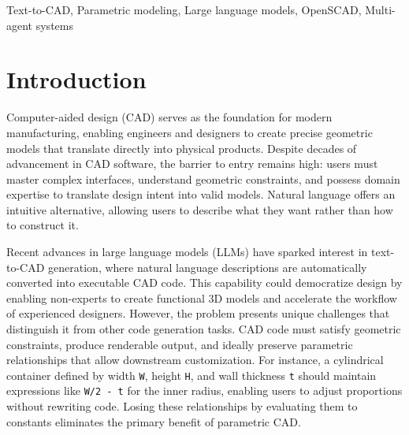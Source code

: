 \documentclass[5p,twocolumn,10pt,times]{elsarticle}
\begin{document}
\begin{frontmatter}
\begin{keyword} Text-to-CAD, Parametric modeling, Large language models, OpenSCAD, Multi-agent systems
\end{keyword}

\end{frontmatter}

\section{Introduction}
\label{sec:intro}
Computer-aided design (CAD) serves as the foundation for modern manufacturing, enabling engineers and designers to create precise geometric models that translate directly into physical products. Despite decades of advancement in CAD software, the barrier to entry remains high: users must master complex interfaces, understand geometric constraints, and possess domain expertise to translate design intent into valid models. Natural language offers an intuitive alternative, allowing users to describe what they want rather than how to construct it.

Recent advances in large language models (LLMs) have sparked interest in text-to-CAD generation, where natural language descriptions are automatically converted into executable CAD code. This capability could democratize design by enabling non-experts to create functional 3D models and accelerate the workflow of experienced designers. However, the problem presents unique challenges that distinguish it from other code generation tasks. CAD code must satisfy geometric constraints, produce renderable output, and ideally preserve parametric relationships that allow downstream customization. For instance, a cylindrical container defined by width \texttt{W}, height \texttt{H}, and wall thickness \texttt{t} should maintain expressions like \texttt{W/2 - t} for the inner radius, enabling users to adjust proportions without rewriting code. Losing these relationships by evaluating them to constants eliminates the primary benefit of parametric CAD.
\end{document}
